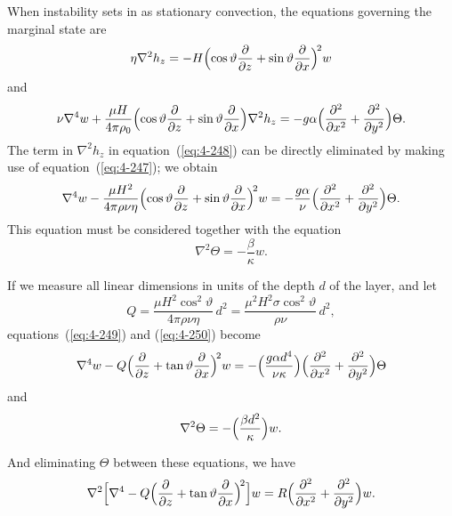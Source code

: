 When instability sets in as stationary convection, the equations governing the marginal state are
\begin{equation}
\label{eq:4-247}
\eta\nabla^2 h_z = -H\Bigl(\cos\vartheta\frac{\partial}{\partial z}+\sin\vartheta\frac{\partial}{\partial x}\Bigr)^{\!2}w
\end{equation}
and
\begin{equation}
\label{eq:4-248}
\nu\nabla^4 w + \frac{\mu H}{4\pi\rho_0}\Bigl(\cos\vartheta\frac{\partial}{\partial z}+\sin\vartheta\frac{\partial}{\partial x}\Bigr)\nabla^2 h_z = -g\alpha\Bigl(\frac{\partial^2}{\partial x^2}+\frac{\partial^2}{\partial y^2}\Bigr)\Theta.
\end{equation}
The term in $\nabla^2 h_z$ in equation~(\ref{eq:4-248}) can be directly eliminated by making use of equation~(\ref{eq:4-247}); we obtain
\begin{equation}
\label{eq:4-249}
\nabla^4 w - \frac{\mu H^2}{4\pi\rho\nu\eta}\Bigl(\cos\vartheta\frac{\partial}{\partial z}+\sin\vartheta\frac{\partial}{\partial x}\Bigr)^{\!2}w = -\frac{g\alpha}{\nu}\Bigl(\frac{\partial^2}{\partial x^2}+\frac{\partial^2}{\partial y^2}\Bigr)\Theta.
\end{equation}
This equation must be considered together with the equation
\begin{equation}
\label{eq:4-250}
\nabla^2\Theta = -\frac{\beta}{\kappa}w.
\end{equation}

If we measure all linear dimensions in units of the depth $d$ of the layer, and let
\begin{equation}
\label{eq:4-251}
Q = \frac{\mu H^2\cos^2\vartheta}{4\pi\rho\nu\eta}\,d^2 = \frac{\mu^2 H^2\sigma\cos^2\vartheta}{\rho\nu}\,d^2,
\end{equation}
equations~(\ref{eq:4-249}) and (\ref{eq:4-250}) become
\begin{equation}
\label{eq:4-252}
\nabla^4 w - Q\Bigl(\frac{\partial}{\partial z}+\tan\vartheta\frac{\partial}{\partial x}\Bigr)^{\!2}w = -\Bigl(\frac{g\alpha d^4}{\nu\kappa}\Bigr)\Bigl(\frac{\partial^2}{\partial x^2}+\frac{\partial^2}{\partial y^2}\Bigr)\Theta
\end{equation}
and
\begin{equation}
\label{eq:4-253}
\nabla^2\Theta = -\Bigl(\frac{\beta d^2}{\kappa}\Bigr)w.
\end{equation}

And eliminating $\Theta$ between these equations, we have
\begin{equation}
\label{eq:4-254}
\nabla^2\Bigl[\nabla^4-Q\Bigl(\frac{\partial}{\partial z}+\tan\vartheta\frac{\partial}{\partial x}\Bigr)^{\!2}\Bigr]w = R\Bigl(\frac{\partial^2}{\partial x^2}+\frac{\partial^2}{\partial y^2}\Bigr)w.
\end{equation}

